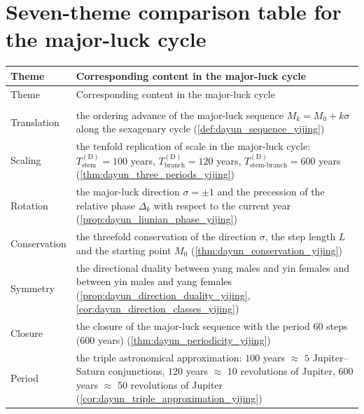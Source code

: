 \section*{Seven-theme comparison table for the major-luck cycle}

\begingroup
\renewcommand{\arraystretch}{1.3}
\begin{longtable}{@{}>{\raggedright\arraybackslash}p{3cm}>{\raggedright\arraybackslash}p{\dimexpr\linewidth-3cm-2\tabcolsep\relax}@{}}
\toprule
Theme & Corresponding content in the major-luck cycle \\
\midrule
\endfirsthead
\toprule
Theme & Corresponding content in the major-luck cycle \\
\midrule
\endhead
\midrule
\multicolumn{2}{r}{\small(continued on the next page)} \\
\endfoot
\bottomrule
\endlastfoot
Translation & the ordering advance of the major-luck sequence $M_k=M_0+k\sigma$ along the sexagenary cycle (\cref{def:dayun_sequence_yijing}) \\
Scaling & the tenfold replication of scale in the major-luck cycle: $T_{\text{stem}}^{\mathrm{(D)}}=100$ years, $T_{\text{branch}}^{\mathrm{(D)}}=120$ years, $T_{\text{stem-branch}}^{\mathrm{(D)}}=600$ years (\cref{thm:dayun_three_periods_yijing}) \\
Rotation & the major-luck direction $\sigma=\pm 1$ and the precession of the relative phase $\Delta_k$ with respect to the current year (\cref{prop:dayun_liunian_phase_yijing}) \\
Conservation & the threefold conservation of the direction $\sigma$, the step length $L$ and the starting point $M_0$ (\cref{thm:dayun_conservation_yijing}) \\
Symmetry & the directional duality between yang males and yin females and between yin males and yang females (\cref{prop:dayun_direction_duality_yijing}, \cref{cor:dayun_direction_classes_yijing}) \\
Closure & the closure of the major-luck sequence with the period $60$ steps ($600$ years) (\cref{thm:dayun_periodicity_yijing}) \\
Period & the triple astronomical approximation: $100$ years $\approx$ $5$ Jupiter--Saturn conjunctions, $120$ years $\approx$ $10$ revolutions of Jupiter, $600$ years $\approx$ $50$ revolutions of Jupiter (\cref{cor:dayun_triple_approximation_yijing}) \\
\end{longtable}
\endgroup
